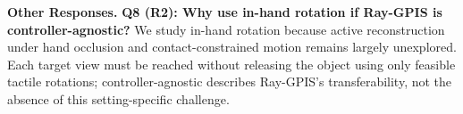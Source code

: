 \documentclass[conference]{IEEEtran}
\newcommand{\newparagraph}[1]{{\bf #1.}}
\begin{document}
\newparagraph{Other Responses}
\textbf{Q8 (R2): Why use in-hand rotation if Ray-GPIS is
controller-agnostic?} We study in-hand rotation because active reconstruction
under hand occlusion and contact-constrained motion remains largely unexplored.
Each target view must be reached without releasing the object using only
feasible tactile rotations; controller-agnostic describes Ray-GPIS's
transferability, not the absence of this setting-specific challenge.


{\small }
\end{document}
